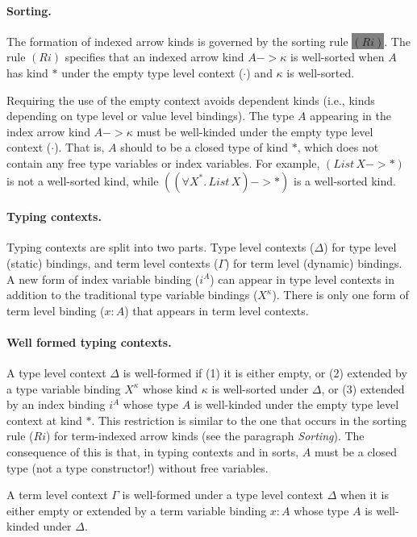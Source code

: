 \documentclass{llncs}
\newcommand{\newFi}[1]{\colorbox{grey}{\ensuremath{#1}}}
\newcommand{\ie}{{i.e.}}
\begin{document}
\paragraph{Sorting.} \label{sorting}
The formation of indexed arrow kinds is
governed by the sorting rule \newFi{(Ri)}. The rule $(Ri)$ specifies that
an indexed arrow kind $A -> \kappa$ is well-sorted when $A$ has kind $*$
under the empty type level context ($\cdot$) and $\kappa$ is well-sorted.

Requiring the use of the empty context avoids dependent kinds (\ie, kinds depending on type level or value level
bindings). The type $A$ appearing in
the index arrow kind $A -> \kappa$ must be well-kinded under
the empty type level context ($\cdot$).
That is, $A$ should to be a closed type of kind $*$,
which does not contain any free type variables or index variables.
For example, $(\textit{List}\,X -> *)$ is not a well-sorted kind,
while $((\forall X^{*}\!.\,\textit{List}\,X) -> *)$ is a well-sorted kind.

\paragraph{Typing contexts.}
Typing contexts are split into two parts.
Type level contexts ($\Delta$) for type level (static) bindings,
and term level contexts ($\Gamma$) for term level (dynamic) bindings.
A new form of index variable binding ($i^A$) can appear in
type level contexts in addition to the traditional type variable bindings ($X^\kappa$).
There is only one form of term level binding ($x:A$) that appears in
term level contexts.

\paragraph{Well formed typing contexts.}
A type level context $\Delta$ is well-formed if (1) it is either empty,
or (2) extended by a type variable binding $X^\kappa$ whose kind $\kappa$ is
well-sorted under $\Delta$, or (3) extended by an index binding $i^A$
whose type $A$ is well-kinded under the empty type level context at kind $*$.
This restriction is similar to the one that occurs in the sorting rule ($Ri$)
for term-indexed arrow kinds (see the paragraph {\textit{Sorting}}).
The consequence of this is that, in typing contexts and in sorts,
$A$ must be a closed type (not a type constructor!) without free variables.

A term level context $\Gamma$ is well-formed under a type level context
$\Delta$ when it is either empty or extended by a term variable binding
$x:A$ whose type $A$ is well-kinded under $\Delta$.
\end{document}

